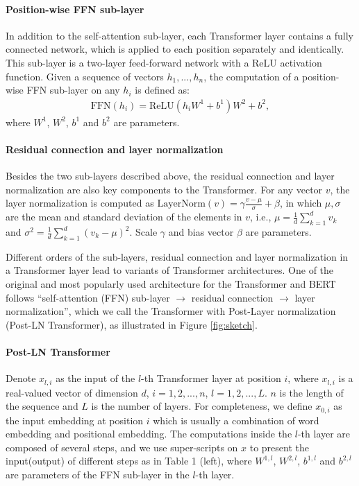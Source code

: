 \documentclass{article}
\begin{document}
\paragraph{Position-wise FFN sub-layer} 
In addition to the self-attention sub-layer, each Transformer layer contains a fully connected network, which is applied to each position separately and identically. This sub-layer is a two-layer feed-forward network with a ReLU activation function. Given a sequence of vectors $h_1, ..., h_n$, the computation of a position-wise FFN sub-layer on any $h_i$ is defined as: 
\begin{align}
\text{FFN}(h_i)=\text{ReLU}(h_iW^1 + b^1)W^2 + b^2, \nonumber 
\end{align}
where $W^1$, $W^2$, $b^1$ and $b^2$ are parameters.

\paragraph{Residual connection and layer normalization}
Besides the two sub-layers described above, the residual connection and layer normalization are also key components to the Transformer. For any vector $v$, the layer normalization is computed as $\text{LayerNorm}(v) = \gamma \frac{v - \mu}{\sigma} + \beta$, in which $\mu, \sigma$ are the mean and standard deviation of the elements in $v$, i.e., $\mu = \frac{1}{d} \sum_{k=1}^d v_{k}$ and $\sigma^2 = \frac{1}{d}\sum_{k=1}^d(v_{k} -\mu)^2$. Scale $\gamma$ and bias vector $\beta$ are parameters.

Different orders of the sub-layers, residual connection and layer normalization in a Transformer layer lead to variants of Transformer architectures. One of the original and most popularly used architecture for the Transformer and BERT \citep{vaswani2017attention, devlin2018bert} follows ``self-attention (FFN) sub-layer $\rightarrow$ residual connection $\rightarrow$ layer normalization'', which we call the Transformer with Post-Layer normalization (Post-LN Transformer), as illustrated in Figure \ref{fig:sketch}.

\paragraph{Post-LN Transformer} Denote $x_{l, i}$ as the input of the $l$-th Transformer layer at position $i$, where $x_{l,i}$ is a real-valued vector of dimension $d$, $i=1,2,...,n$, $l=1,2,...,L$. $n$ is the length of the sequence and $L$ is the number of layers. For completeness, we define $x_{0,i}$ as the input embedding at position $i$ which is usually a combination of word embedding and positional embedding. The computations inside the $l$-th layer are composed of several steps, and we use super-scripts on $x$ to present the input(output) of different steps as in Table 1 (left), where $W^{1,l}$, $W^{2,l}$, $b^{1,l}$ and $b^{2,l}$ are parameters of the FFN sub-layer in the $l$-th layer.
\end{document}

